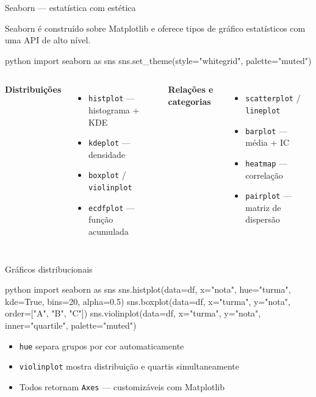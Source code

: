 \documentclass[xcolor=dvipsnames,t,aspectratio=169]{beamer}
\newcommand{\highlight}[1]{{\color{nes_dark_orange} #1}}
\begin{document}
\begin{frame}[c, fragile]{Seaborn — estatística com estética}

Seaborn é construído sobre Matplotlib e oferece \highlight{tipos de gráfico estatísticos} com uma API de alto nível.

\begin{code}{python}
import seaborn as sns
sns.set_theme(style="whitegrid", palette="muted")
\end{code}

\begin{columns}
\textbf{\color{nes_dark_purple}Distribuições}
\begin{itemize}
    \item \texttt{histplot} — histograma + KDE
    \item \texttt{kdeplot} — densidade
    \item \texttt{boxplot} / \texttt{violinplot}
    \item \texttt{ecdfplot} — função acumulada
\end{itemize}

\textbf{\color{nes_dark_purple}Relações e categorias}
\begin{itemize}
    \item \texttt{scatterplot} / \texttt{lineplot}
    \item \texttt{barplot} — média + IC
    \item \texttt{heatmap} — correlação
    \item \texttt{pairplot} — matriz de dispersão
\end{itemize}
\end{columns}

\end{frame}


\begin{frame}[c, fragile]{Gráficos distribucionais}

\begin{code}{python}
import seaborn as sns
sns.histplot(data=df, x="nota", hue="turma",
             kde=True, bins=20, alpha=0.5)
sns.boxplot(data=df, x="turma", y="nota",
            order=["A", "B", "C"])
sns.violinplot(data=df, x="turma", y="nota",
               inner="quartile", palette="muted")
\end{code}

\begin{itemize}
    \item \texttt{hue} separa grupos por cor automaticamente
    \item \texttt{violinplot} mostra distribuição \highlight{e} quartis simultaneamente
    \item Todos retornam \texttt{Axes} — customizáveis com Matplotlib
\end{itemize}

\end{frame}
\end{document}
